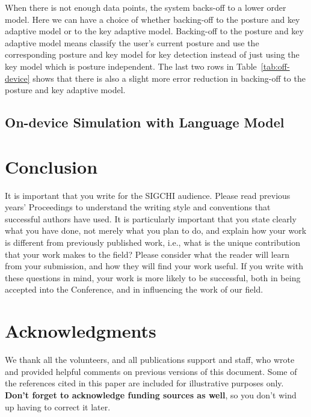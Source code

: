 \documentclass{sigchi}
\begin{document}
When there is not enough data points, the system backs-off to a lower order model.
Here we can have a choice of whether backing-off to the posture and key adaptive model or 
to the key adaptive model. Backing-off to the posture and key adaptive model means
classify the user's current posture and use the corresponding posture and key model for key detection instead
of just using the key model which is posture independent. The last two rows in 
Table~\ref{tab:off-device} shows that there is also a slight more error reduction  in backing-off to
the posture and key adaptive model.

\subsection{On-device Simulation with Language Model}

\section{Conclusion}

It is important that you write for the SIGCHI audience.  Please read
previous years' Proceedings to understand the writing style and
conventions that successful authors have used.  It is particularly
important that you state clearly what you have done, not merely what
you plan to do, and explain how your work is different from previously
published work, i.e., what is the unique contribution that your work
makes to the field?  Please consider what the reader will learn from
your submission, and how they will find your work useful.  If you
write with these questions in mind, your work is more likely to be
successful, both in being accepted into the Conference, and in
influencing the work of our field.

\section{Acknowledgments}

We thank all the volunteers, and all publications support
and staff, who wrote and provided helpful comments on previous
versions of this document.  Some of the references cited in this paper
are included for illustrative purposes only.  \textbf{Don't forget
to acknowledge funding sources as well}, so you don't wind up
having to correct it later.

%
%
%
%
%
\balance



\end{document}
